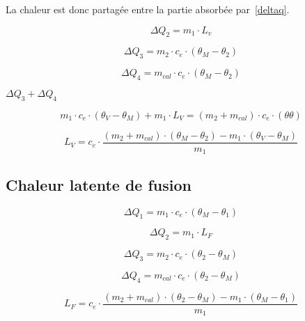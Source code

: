 La chaleur est donc partagée entre la partie absorbée par~\eqref{deltaq}.

\begin{equation}
    \Delta Q_2 = m_1 \cdot L_v
\end{equation}


\begin{equation}
    \Delta Q_3 = m_2 \cdot c_e \cdot (\theta_M - \theta_2)
\end{equation}

\begin{equation}
    \Delta Q_4 = m_{cal} \cdot c_e \cdot (\theta_M - \theta_2)
\end{equation}

$\Delta Q_3 + \Delta Q_4$

\begin{equation}
    m_1 \cdot c_e \cdot (\theta_V - \theta_M) + m_1 \cdot L_V = (m_2 + m_{cal}) \cdot c_e \cdot (\theta \theta)
\end{equation}

\begin{equation}
    L_V = c_e \cdot \frac{(m_2 + m_{cal})\cdot (\theta_M - \theta_2) - m_1 \cdot (\theta_V - \theta_M)}{m_1}
\end{equation}

\subsection{Chaleur latente de fusion}
\begin{equation}
    \Delta Q_1 = m_1 \cdot c_e \cdot (\theta_M - \theta_1)
\end{equation}

\begin{equation}
    \Delta Q_2=m_1 \cdot L_F
\end{equation}

\begin{equation}
    \Delta Q_3 = m_2 \cdot c_e \cdot (\theta_2 - \theta_M)
\end{equation}

\begin{equation}
    \Delta Q_4 = m_{cal} \cdot c_e \cdot (\theta_2 - \theta_M)
\end{equation}

\begin{equation}
    L_F = c_e \cdot \frac{(m_2 + m_{cal}) \cdot (\theta_2 -\theta_M)-m_1 \cdot (\theta_M - \theta_1)}{m_1}
\end{equation}
